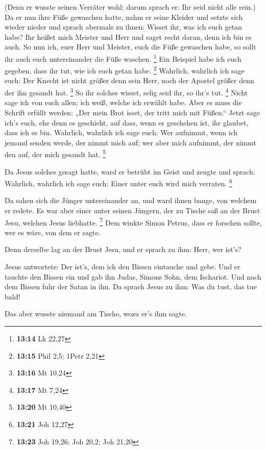  (Denn er wusste seinen Verräter wohl; darum sprach er: Ihr
seid nicht alle rein.)  Da er nun ihre Füße gewaschen
hatte, nahm er seine Kleider und setzte sich wieder nieder und sprach
abermals zu ihnen: Wisset ihr, was ich euch getan habe? 
Ihr heißet mich Meister und Herr und saget recht daran, denn ich bin es
auch.  So nun ich, euer Herr und Meister, euch die Füße
gewaschen habe, so sollt ihr auch euch untereinander die Füße waschen.
\footnote{\textbf{13:14} Lk 22,27}  Ein Beispiel habe ich
euch gegeben, dass ihr tut, wie ich euch getan habe. \footnote{\textbf{13:15}
  Phil 2,5; 1Petr 2,21}  Wahrlich, wahrlich ich sage euch:
Der Knecht ist nicht größer denn sein Herr, noch der Apostel größer denn
der ihn gesandt hat. \footnote{\textbf{13:16} Mt 10,24}  So
ihr solches wisset, selig seid ihr, so ihr's tut. \footnote{\textbf{13:17}
  Mt 7,24}  Nicht sage ich von euch allen; ich weiß, welche
ich erwählt habe. Aber es muss die Schrift erfüllt werden: „Der mein
Brot isset, der tritt mich mit Füßen.``  Jetzt sage ich's
euch, ehe denn es geschieht, auf dass, wenn es geschehen ist, ihr
glaubet, dass ich es bin.  Wahrlich, wahrlich ich sage
euch: Wer aufnimmt, wenn ich jemand senden werde, der nimmt mich auf;
wer aber mich aufnimmt, der nimmt den auf, der mich gesandt hat.
\footnote{\textbf{13:20} Mt 10,40}

 Da Jesus solches gesagt hatte, ward er betrübt im Geist
und zeugte und sprach: Wahrlich, wahrlich ich sage euch: Einer unter
euch wird mich verraten. \footnote{\textbf{13:21} Joh 12,27}

 Da sahen sich die Jünger untereinander an, und ward ihnen
bange, von welchem er redete.  Es war aber einer unter
seinen Jüngern, der zu Tische saß an der Brust Jesu, welchen Jesus
liebhatte. \footnote{\textbf{13:23} Joh 19,26; Joh 20,2; Joh 21,20}
 Dem winkte Simon Petrus, dass er forschen sollte, wer es
wäre, von dem er sagte.

 Denn derselbe lag an der Brust Jesu, und er sprach zu ihm:
Herr, wer ist's?

 Jesus antwortete: Der ist's, dem ich den Bissen eintauche
und gebe. Und er tauchte den Bissen ein und gab ihn Judas, Simons Sohn,
dem Ischariot.  Und nach dem Bissen fuhr der Satan in ihn.
Da sprach Jesus zu ihm: Was du tust, das tue bald!

 Das aber wusste niemand am Tische, wozu er's ihm sagte.

